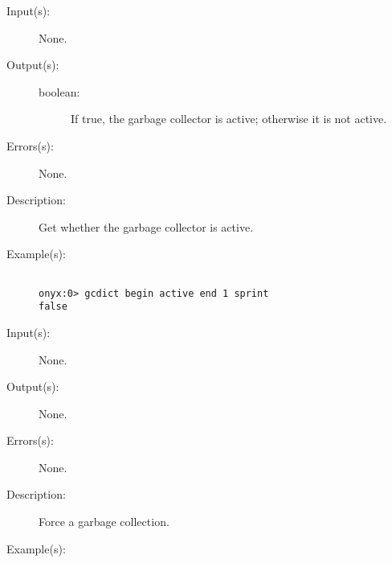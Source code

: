 \begin{description}
\label{gcdict:active}
\item[{\onyxop{--}{active}{boolean}}: ]
	\begin{description}\item[]
	\item[Input(s): ] None.
	\item[Output(s): ]
		\begin{description}\item[]
		\item[boolean: ]
			If true, the garbage collector is active; otherwise it
			is not active.
		\end{description}
	\item[Errors(s): ] None.
	\item[Description: ]
		Get whether the garbage collector is active.
	\item[Example(s): ]\begin{verbatim}

onyx:0> gcdict begin active end 1 sprint
false
		\end{verbatim}
	\end{description}
\label{gcdict:collect}
\item[{\onyxop{--}{collect}{--}}: ]
	\begin{description}\item[]
	\item[Input(s): ] None.
	\item[Output(s): ] None.
	\item[Errors(s): ] None.
	\item[Description: ]
		Force a garbage collection.
	\item[Example(s): ]\begin{verbatim}


\end{verbatim}
\end{description}
\end{description}
